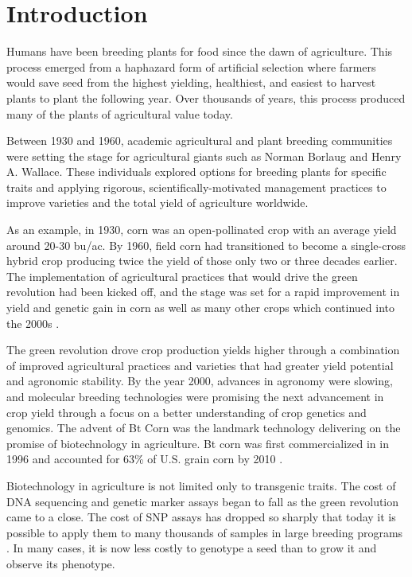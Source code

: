 \section{Introduction} \label{sec:gen-intro}

Humans have been breeding plants for food since the dawn of agriculture. This process
emerged from a haphazard form of artificial selection where farmers would save seed from the 
highest yielding, healthiest, and easiest to harvest plants to plant the following year. 
Over thousands of years, this process produced many of the plants of  
agricultural value today.

Between 1930 and 1960, academic agricultural and plant breeding communities were setting the
stage for agricultural giants such as Norman Borlaug and Henry A. Wallace. These individuals 
explored options for breeding plants for specific traits and applying rigorous, 
scientifically-motivated management practices to improve varieties and the total yield 
of agriculture worldwide.

As an example, in 1930, corn was an open-pollinated crop with an average 
yield around 20-30 bu/ac. By 1960, field corn had transitioned to become a single-cross 
hybrid crop producing twice the yield of those only two or three decades earlier. The implementation
of agricultural practices that would drive the green revolution had been kicked off, and
the stage was set for a rapid improvement in yield and genetic gain in
corn as well as many other crops which continued into the 2000s \citep{evenson2003}.

The green revolution drove crop production yields higher through a combination of 
improved agricultural practices and varieties that had greater yield potential
and agronomic stability. By the year 2000, advances in agronomy were slowing, and 
molecular breeding technologies were promising the next advancement in crop yield
through a focus on a better understanding of crop genetics and genomics. 
The advent of Bt Corn was the landmark technology delivering on the promise of 
biotechnology in agriculture. Bt corn was first commercialized in in 1996 and 
accounted for 63\% of U.S. grain corn by 2010 \citep{fernandez2012}. 

Biotechnology in agriculture is not limited only to transgenic traits. The cost of 
DNA sequencing and genetic marker assays began to fall as the green revolution
came to a close. The cost of SNP assays has dropped so sharply that today it is 
possible to apply them to many thousands of samples in large breeding programs \citep{hiremath2012}. 
In many cases, it is now less costly to genotype a seed than to grow it and observe its phenotype.

